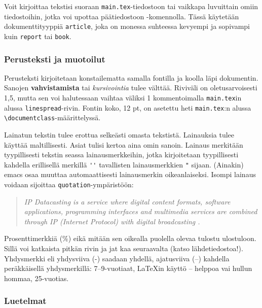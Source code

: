 Voit kirjoittaa tekstisi suoraan \verb!main.tex!-tiedostoon tai
vaikkapa luvuittain omiin tiedostoihin, jotka voi upottaa
päätiedostoon \verb!!-komennolla. Tässä käytetään
dokumenttityyppiä \verb!article!, joka on monessa suhteessa kevyempi
ja sopivampi kuin \verb!report! tai \verb!book!.


\subsubsection{Perusteksti ja muotoilut}

\begin{sloppypar}
Perusteksti kirjoitetaan konstailematta samalla fontilla ja koolla
läpi dokumentin. Sanojen \textbf{vahvistamista} tai
\textit{kursivointia} tulee välttää.  Riviväli on oletusarvoisesti
1,5, mutta sen voi halutessaan vaihtaa väliksi 1 kommentoimalla
\verb!main.tex!in alussa \verb!linespread!-rivin.  Fontin koko, 12 pt,
on asetettu heti \verb!main.tex!:n alussa
\verb!\documentclass!-määrittelyssä.
\end{sloppypar}


Lainatun tekstin tulee erottua selkeästi omasta tekstistä. Lainauksia
tulee käyttää maltillisesti. Asiat tulisi kertoa aina omin
sanoin. Lainaus merkitään tyypillisesti tekstin seassa
lainausmerkkeihin, jotka kirjoitetaan tyypillisesti kahdella
erillisellä merkillä \verb!''! tavallisten lainausmerkkien \verb!"!
sijaan. (Ainakin) emacs osaa muuttaa automaattisesti lainausmerkin
oikeanlaiseksi. Isompi lainaus voidaan sijoittaa
\verb!quotation!-ympäristöön:

\begin{quotation} { 
\noindent \it
IP Datacasting is a service where digital content formats, software
applications, programming interfaces and multimedia services are
combined through IP (Internet Protocol) with digital
broadcasting \citep{ipdcforum_def}. } 
\end{quotation}

Prosenttimerkkiä (\%) eikä mitään sen oikealla puolella olevaa tulostu
ulostuloon. Sillä voi katkaista pitkän rivin ja jat%
kaa seuraavalta (katso lähdetiedostoa!).  Yhdysmerkki eli yhdysviiva
(-) saadaan yhdellä, ajatusviiva (--) kahdella peräkkäisellä
yhdysmerkillä: 7--9-vuotiaat, LaTeXin käyttö -- helppoa vai hullun
hommaa, 25-vuotias.

\subsubsection{Luetelmat}
\label{sec:esimluettelo}

